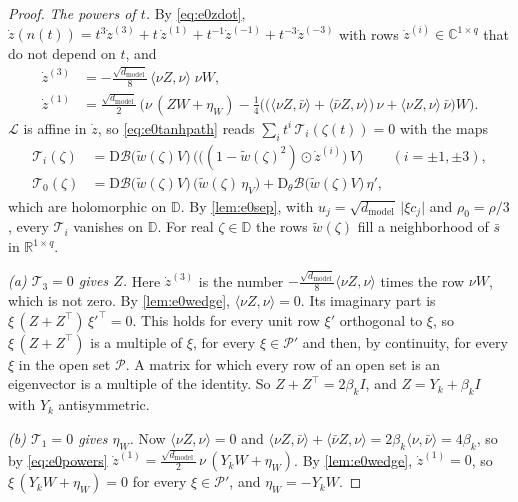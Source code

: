 \documentclass[10pt]{article}
\theoremstyle{definition}
\theoremstyle{remark}
\newcommand{\R}{\mathbb{R}}
\newcommand{\dm}{d_{\mathrm{model}}}
\newcommand{\Der}{\mathrm{D}}
\begin{document}
\begin{proof}
\emph{The powers of $t$.} By \eqref{eq:e0zdot}, $\dot z(n(t)) = t^3\dot z^{(3)} + t\,\dot z^{(1)} + t^{-1}\dot z^{(-1)} + t^{-3}\dot z^{(-3)}$ with rows $\dot z^{(i)} \in \mathbb C^{1\times q}$ that do not depend on $t$, and
\begin{equation}\label{eq:e0powers}
\begin{aligned}
\dot z^{(3)} &= -\frac{\sqrt{\dm}}{8}\,\langle\nu Z, \nu\rangle\;\nu W, \\
\dot z^{(1)} &= \frac{\sqrt{\dm}}{2}\,\Big(\nu\,(ZW + \eta_W) - \frac14\Big(\big(\langle\nu Z, \bar\nu\rangle + \langle\bar\nu Z, \nu\rangle\big)\,\nu + \langle\nu Z, \nu\rangle\,\bar\nu\Big)W\Big).
\end{aligned}
\end{equation}
$\mathcal L$ is affine in $\dot z$, so \eqref{eq:e0tanhpath} reads $\sum_i t^i\,\mathcal T_i(\zeta(t)) = 0$ with the maps
\begin{align*}
\mathcal T_i(\zeta) &= \Der\mathcal B\big(\tilde w(\zeta)V\big)\,\Big(\big((1 - \tilde w(\zeta)^2)\odot\dot z^{(i)}\big)\,V\Big) \qquad (i = \pm1, \pm3),\\
\mathcal T_0(\zeta) &= \Der\mathcal B\big(\tilde w(\zeta)V\big)\,\big(\tilde w(\zeta)\,\eta_V\big) + \Der_\theta\mathcal B\big(\tilde w(\zeta)V\big)\,\eta' ,
\end{align*}
which are holomorphic on $\mathbb D$. By \cref{lem:e0sep}, with $u_j = \sqrt{\dm}\,\lvert\xi c_j\rvert$ and $\rho_0 = \rho/3$, every $\mathcal T_i$ vanishes on $\mathbb D$. For real $\zeta \in \mathbb D$ the rows $\tilde w(\zeta)$ fill a neighborhood of $\bar s$ in $\R^{1\times q}$.

\emph{(a) $\mathcal T_3 = 0$ gives $Z$.} Here $\dot z^{(3)}$ is the number $-\frac{\sqrt{\dm}}{8}\langle\nu Z, \nu\rangle$ times the row $\nu W$, which is not zero. By \cref{lem:e0wedge}, $\langle\nu Z, \nu\rangle = 0$. Its imaginary part is $\xi\,(Z + Z^\top)\,\xi'^\top = 0$. This holds for every unit row $\xi'$ orthogonal to $\xi$, so $\xi\,(Z + Z^\top)$ is a multiple of $\xi$, for every $\xi \in \mathcal P'$ and then, by continuity, for every $\xi$ in the open set $\mathcal P$. A matrix for which every row of an open set is an eigenvector is a multiple of the identity. So $Z + Z^\top = 2\beta_kI$, and $Z = Y_k + \beta_kI$ with $Y_k$ antisymmetric.

\emph{(b) $\mathcal T_1 = 0$ gives $\eta_W$.} Now $\langle\nu Z, \nu\rangle = 0$ and $\langle\nu Z, \bar\nu\rangle + \langle\bar\nu Z, \nu\rangle = 2\beta_k\langle\nu, \bar\nu\rangle = 4\beta_k$, so by \eqref{eq:e0powers} $\dot z^{(1)} = \frac{\sqrt{\dm}}{2}\,\nu\,(Y_kW + \eta_W)$. By \cref{lem:e0wedge}, $\dot z^{(1)} = 0$, so $\xi\,(Y_kW + \eta_W) = 0$ for every $\xi \in \mathcal P'$, and $\eta_W = -Y_kW$.


\end{proof}
\end{document}
